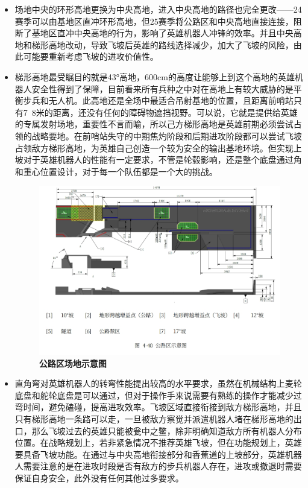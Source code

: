 \begin{itemize}
                \item 场地中央的环形高地更换为中央高地，进入中央高地的路径也完全更改——24赛季可以由基地区直冲环形高地，但25赛季将公路区和中央高地直接连接，阻断了基地区直冲中央高地的行为，影响了英雄机器人冲锋的效率。并且中央高地和梯形高地改动，导致飞坡后英雄的路线选择减少，加大了飞坡的风险，由此可能要重新考虑飞坡的进攻价值性。

                \newpage
    
                \item 梯形高地最受瞩目的就是43°高地，600cm的高度让能够上到这个高地的英雄机器人安全性得到了保障，目前看来所有兵种之中对在高地上有较大威胁的是平衡步兵和无人机。此高地还是全场中最适合吊射基地的位置，且距离前哨站只有7~8米的距离，还没有任何的障碍物遮挡视野。可以说，它就是提供给英雄的专属发射场地，重要性不言而喻，所以己方梯形高地是英雄前期必须尝试占领的战略要地。在前哨站失守的中期焦灼阶段和后期进攻阶段都可以尝试飞坡占领敌方梯形高地，为英雄自己创造一个较为安全的输出基地环境。但实现上坡对于英雄机器人的性能有一定要求，不管是轮毂影响，还是整个底盘通过角和重心位置设计，对于每一个队伍都是一个大的挑战。
                
                \begin{figure}[H]
                    \centering
                    \includegraphics[height=0.35\textwidth]{figure/highwayArea.png}
                    \hspace{0.5em}
                    \caption{\textbf{\textbf{公路区场地示意图}}}
                    \label{fig:highwayArea}
                \end{figure}
    
                \item 直角弯对英雄机器人的转弯性能提出较高的水平要求，虽然在机械结构上麦轮底盘和舵轮底盘是可以通过，但对于操作手来说需要有熟练的操作才能减少过弯时间，避免磕碰，提高进攻效率。飞坡区域直接衔接到敌方梯形高地，并且只有梯形高地一条路可以走，一旦被敌方察觉并派遣机器人堵在梯形高地的出口，那么飞坡过去的英雄只能被瓮中之鳖，除非明确知道敌方所有机器人分布位置。在战略规划上，若非紧急情况不推荐英雄飞坡，但在功能规划上，英雄要具备飞坡功能。在通过与中央高地衔接部分和香蕉道的上坡部分，英雄机器人需要注意的是在进攻时段是否有敌方的步兵机器人存在，进攻或撤退时需要保证自身安全，此外没有任何其他过多要求。
    

\end{itemize}

